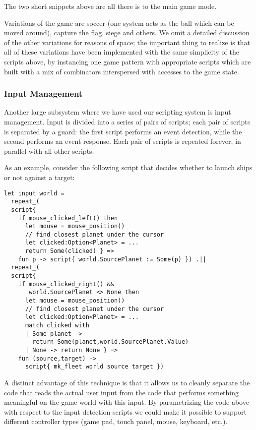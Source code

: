 The two short snippets above are all there is to the main game mode.

Variations of the game are soccer (one system acts as the ball which can be moved around), capture the flag, siege and others. We omit a detailed discussion of the other variations for reasons of space; the important thing to realize is that all of these variations have been implemented with the same simplicity of the scripts above, by instancing one game pattern with appropriate scripts which are built with a mix of combinators interspersed with accesses to the game state.

\subsubsection{Input Management}

Another large subsystem where we have used our scripting system is input management. Input is divided into a series of pairs of scripts; each pair of scripts is separated by a guard: the first script performs an event detection, while the second performs an event response. Each pair of scripts is repeated forever, in parallel with all other scripts.

As an example, consider the following script that decides whether to launch ships or not against a target:
\begin{lstlisting}
let input world = 
  repeat_(
  script{ 
    if mouse_clicked_left() then
      let mouse = mouse_position()
      // find closest planet under the cursor
      let clicked:Option<Planet> = ... 
      return Some(clicked) } => 
    fun p -> script{ world.SourcePlanet := Some(p) }) .||
  repeat_(
  script{ 
    if mouse_clicked_right() && 
       world.SourcePlanet <> None then
      let mouse = mouse_position()
      // find closest planet under the cursor
      let clicked:Option<Planet> = ... 
      match clicked with 
      | Some planet -> 
        return Some(planet,world.SourcePlanet.Value)
      | None -> return None } => 
    fun (source,target) -> 
      script{ mk_fleet world source target })
\end{lstlisting}

A distinct advantage of this technique is that it allows us to cleanly separate the code that reads the actual user input from the code that performs something meaningful on the game world with this input. By parametrizing the code above with respect to the input detection scripts we could make it possible to support different controller types (game pad, touch panel, mouse, keyboard, etc.).

